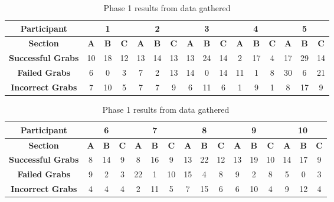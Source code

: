 \documentclass[12pt]{article}
\begin{document}
\begin{table}[!ht]
\centering
\begin{tabular}{ |c|c|c|c|c|c|c|c|c|c|c|c|c|c|c|c| }
 	\hline
	\textbf{Participant} & \multicolumn{3}{|c|}{\textbf{1}} &  \multicolumn{3}{|c|}{\textbf{2}} & \multicolumn{3}{|c|}{\textbf{3}} & \multicolumn{3}{|c|}{\textbf{4}} & \multicolumn{3}{|c|}{\textbf{5}} \\
	\hline
	\textbf{Section} & \textbf{A} & \textbf{B} & \textbf{C} & \textbf{A} & \textbf{B} & \textbf{C} & \textbf{A} & \textbf{B} & \textbf{C} & \textbf{A} & \textbf{B} & \textbf{C} & \textbf{A} & \textbf{B} & \textbf{C} \\
	\hline
	\textbf{Successful Grabs} & 10 & 18 & 12 & 13 & 14 & 13 & 13 & 24 & 14 & 2 & 17 & 4 & 17 & 29 & 14 \\
	\hline
	\textbf{Failed Grabs} & 6 & 0 & 3 & 7 & 2 & 13 & 14 & 0 & 14 & 11 & 1 & 8 & 30 & 6 & 21 \\
	\hline
	\textbf{Incorrect Grabs} & 7 & 10 & 5 & 7 & 7 & 9 & 6 & 11 & 6 & 1 & 9 & 1 & 8 & 17 & 9 \\
	\hline
\end{tabular}

\centering
\vspace{1cm}\begin{tabular}{ |c|c|c|c|c|c|c|c|c|c|c|c|c|c|c|c| }
 	\hline
	\textbf{Participant} & \multicolumn{3}{|c|}{\textbf{6}} & \multicolumn{3}{|c|}{\textbf{7}} & \multicolumn{3}{|c|}{\textbf{8}} & \multicolumn{3}{|c|}{\textbf{9}} & \multicolumn{3}{|c|}{\textbf{10}} \\
	\hline
	\textbf{Section} & \textbf{A} & \textbf{B} & \textbf{C} & \textbf{A} & \textbf{B} & \textbf{C} & \textbf{A} & \textbf{B} & \textbf{C} & \textbf{A} & \textbf{B} & \textbf{C} & \textbf{A} & \textbf{B} & \textbf{C} \\
	\hline
	\textbf{Successful Grabs} & 8 & 14 & 9 & 8 & 16 & 9 & 13 & 22 & 12 & 13 & 19 & 10 & 14 & 17 & 9 \\
	\hline
	\textbf{Failed Grabs} & 9 & 2 & 3 & 22 & 1 & 10 & 15 & 4 & 8 & 9 & 2 & 8 & 5 & 0 & 3 \\
	\hline
	\textbf{Incorrect Grabs} & 4 & 4 & 4 & 2 & 11 & 5 & 7 & 15 & 6 & 6 & 10 & 4 & 9 & 12 & 4 \\
	\hline
\end{tabular}

\caption{Phase 1 results from data gathered}
\end{table}
\end{document}
